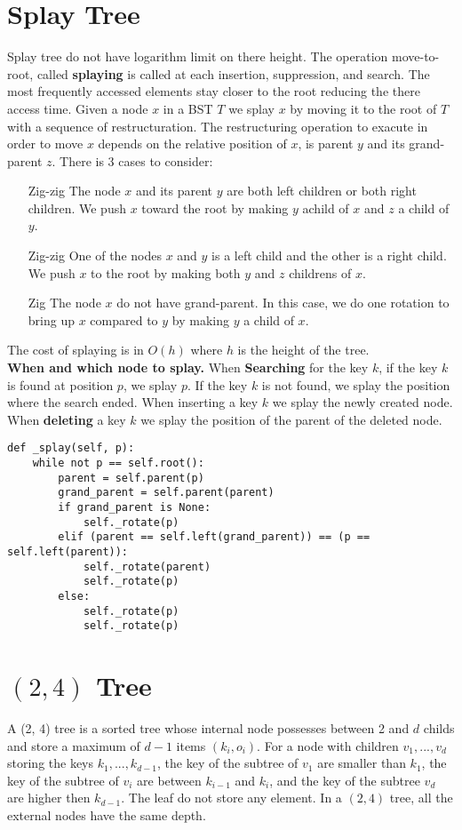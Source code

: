 \documentclass[10pt]{article}
\begin{document}
\section{Splay Tree}
Splay tree do not have logarithm limit on there height. The operation move-to-root, called \textbf{splaying} is called at each insertion, suppression, and search. The most frequently accessed elements stay closer to the root reducing the there access time. Given a node $x$ in a BST $T$ we splay $x$ by moving it to the root of $T$ with a sequence of restructuration. The restructuring operation to exacute in order to move $x$ depends on the relative position of $x$, is parent $y$ and its grand-parent $z$. There is 3 cases to consider:
\begin{itemize}
	\item[Zig-zig] The node $x$ and its parent $y$ are both left children or both right children. We push $x$ toward the root by making $y$ achild of $x$ and $z$ a child of $y$.
	\item[Zig-zig] One of the nodes $x$ and $y$ is a left child and the other is a right child. We push $x$ to the root by making both $y$ and $z$ childrens of $x$.  
	\item[Zig] The node $x$ do not have grand-parent. In this case, we do one rotation to bring up $x$ compared to $y$ by making $y$ a child of $x$.   
\end{itemize}

The cost of splaying is in $O(h)$ where $h$ is the height of the tree. \\

\textbf{When and which node to splay.} When \textbf{Searching} for the key $k$, if the key $k$ is found at position $p$, we splay $p$. If the key $k$ is not found, we splay the position where the search ended. When inserting a key $k$ we splay the newly created node. When \textbf{deleting} a key $k$ we splay the position of the parent of the deleted node.  
\begin{verbatim}
def _splay(self, p):
    while not p == self.root():
        parent = self.parent(p)
        grand_parent = self.parent(parent)
        if grand_parent is None:
            self._rotate(p)
        elif (parent == self.left(grand_parent)) == (p == self.left(parent)):
            self._rotate(parent)
            self._rotate(p)
        else:
            self._rotate(p)
            self._rotate(p)
\end{verbatim}

\section{$(2, 4)$ Tree}
A (2, 4) tree is a sorted tree whose internal node possesses between 2 and $d$ childs and store a maximum of $d-1$ items $(k_i, o_i)$. For a node with children $v_1,...,v_d$ storing the keys $k_1,...,k_{d-1}$, the key of the subtree of $v_1$ are smaller than $k_1$, the key of the subtree of $v_i$ are between $k_{i-1}$ and $k_i$, and the key of the subtree $v_d$ are higher then $k_{d-1}$. The leaf do not store any element. In a $(2, 4)$ tree, all the external nodes have the same depth. 
\end{document}
